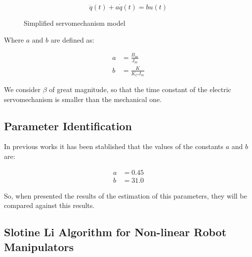 \documentclass[journal]{IEEEtran}
\begin{document}
        \begin{equation} \label{servolineal}
            \ddot{q}(t) + a \dot{q}(t) = b u(t)
        \end{equation}

        \begin{figure}[!t]
            \begin{center}
            \end{center}
            \caption{Simplified servomechanism model}
            \label{fig_simpleservomodel}
        \end{figure}

        Where $a$ and $b$ are defined as:

        \begin{align}
            a &= \frac{B_m}{J_m} \\
            b &= \frac{K}{K_C J_m}
        \end{align}

        We consider $\beta$ of great magnitude, so that the time constant of the electric servomechanism is smaller than the mechanical one.
        
    \subsection{Parameter Identification}

        In previous works it has been stablished that the values of the constants $a$ and $b$ are:

        \begin{align}   
            a &= 0.45 \\
            b &= 31.0
        \end{align}

        So, when presented the results of the estimation of this parameters, they will be compared against this results.

    \subsection{Slotine Li Algorithm for Non-linear Robot Manipulators}
\end{document}
